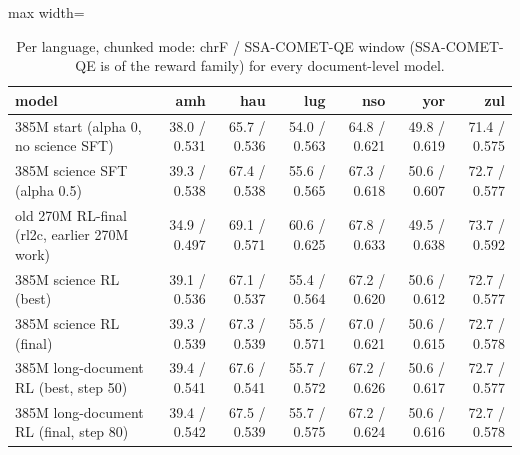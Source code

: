 \begin{table}[t]
\centering\scriptsize
\setlength{\tabcolsep}{4pt}
\caption{Per language, chunked mode: chrF / SSA-COMET-QE window (SSA-COMET-QE is of the reward family) for every document-level model.}\label{tab:doc-per-language}
\begin{adjustbox}{max width=\linewidth}\begin{tabular}{@{}lrrrrrr@{}}
\toprule
model & amh & hau & lug & nso & yor & zul \\
\midrule
385M start (alpha 0, no science SFT) & 38.0 / 0.531 & 65.7 / 0.536 & 54.0 / 0.563 & 64.8 / 0.621 & 49.8 / 0.619 & 71.4 / 0.575 \\
385M science SFT (alpha 0.5) & 39.3 / 0.538 & 67.4 / 0.538 & 55.6 / 0.565 & 67.3 / 0.618 & 50.6 / 0.607 & 72.7 / 0.577 \\
old 270M RL-final (rl2c, earlier 270M work) & 34.9 / 0.497 & 69.1 / 0.571 & 60.6 / 0.625 & 67.8 / 0.633 & 49.5 / 0.638 & 73.7 / 0.592 \\
385M science RL (best) & 39.1 / 0.536 & 67.1 / 0.537 & 55.4 / 0.564 & 67.2 / 0.620 & 50.6 / 0.612 & 72.7 / 0.577 \\
385M science RL (final) & 39.3 / 0.539 & 67.3 / 0.539 & 55.5 / 0.571 & 67.0 / 0.621 & 50.6 / 0.615 & 72.7 / 0.578 \\
385M long-document RL (best, step 50) & 39.4 / 0.541 & 67.6 / 0.541 & 55.7 / 0.572 & 67.2 / 0.626 & 50.6 / 0.617 & 72.7 / 0.577 \\
385M long-document RL (final, step 80) & 39.4 / 0.542 & 67.5 / 0.539 & 55.7 / 0.575 & 67.2 / 0.624 & 50.6 / 0.616 & 72.7 / 0.578 \\
\bottomrule
\end{tabular}\end{adjustbox}
\end{table}

